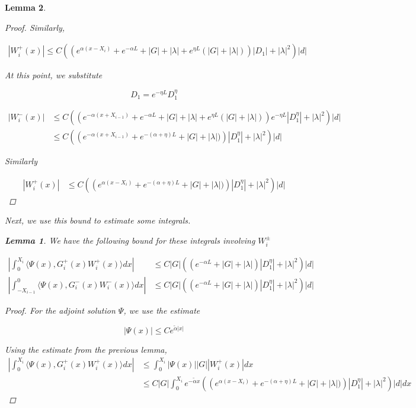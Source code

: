 \documentclass[12pt]{article}
\newtheorem{lemma}{Lemma}
\begin{document}
\begin{lemma}
\begin{proof}
Similarly,

\begin{align*}
| W_i^+(x)| \leq C\left(\left( e^{\alpha(x - X_{i})} + e^{-\alpha L} + |G| + |\lambda| + e^{\eta L}(|G| + |\lambda|) \right)|D_1| + |\lambda|^2 \right) |d|
\end{align*}

At this point, we substitute

\[
D_1 = e^{-\eta L} D_1^{\eta}
\]

\begin{align*}
| W_i^-(x)| &\leq C\left(\left( e^{-\alpha(x + X_{i-1})} + e^{-\alpha L} + |G| + |\lambda| + e^{\eta L}(|G| + |\lambda|) \right)e^{-\eta L} |D_1^{\eta}| + |\lambda|^2 \right) |d| \\
&\leq C\left(\left( e^{-\alpha(x + X_{i-1})} + e^{-(\alpha + \eta) L} + |G| + |\lambda| ) \right) |D_1^{\eta}| + |\lambda|^2 \right) |d|
\end{align*}

Similarly

\begin{align*}
| W_i^+(x)| &\leq C\left(\left( e^{\alpha(x - X_{i})} + e^{-(\alpha + \eta) L} + |G| + |\lambda| ) \right) |D_1^{\eta}| + |\lambda|^2 \right) |d|
\end{align*}

\end{proof}

Next, we use this bound to estimate some integrals.

\begin{lemma}
We have the following bound for these integrals involving $W_i^\pm$

\begin{align*}
\left| \int_0^{X_i} \langle \Psi(x), G_i^+(x) W_i^+(x) \rangle dx \right| &\leq C|G| \left( \left( e^{-\alpha L} + |G| + |\lambda|  \right) |D_1^{\eta}| + |\lambda|^2 \right)|d| \\
\left| \int_{-X_{i-1}}^0 \langle \Psi(x), G_i^-(x) W_i^-(x) \rangle dx \right| &\leq C|G| \left( \left( e^{-\alpha L} + |G| + |\lambda|  \right) |D_1^{\eta}| + |\lambda|^2 \right)|d|
\end{align*}

\begin{proof}

For the adjoint solution $\Psi$, we use the estimate

\[
|\Psi(x)| \leq C e^{\tilde{\alpha}|x|}
\]

Using the estimate from the previous lemma,
\begin{align*}
\left| \int_0^{X_i} \langle \Psi(x), G_i^+(x) W_i^+(x) \rangle dx \right| &\leq \int_0^{X_i} |\Psi(x)||G| |W_i^+(x)| dx \\
&\leq C|G| \int_0^{X_i} e^{-\tilde{\alpha} x} \left(\left( e^{\alpha(x - X_{i})} + e^{-(\alpha + \eta) L} + |G| + |\lambda| ) \right) |D_1^{\eta}| + |\lambda|^2 \right) |d|dx 
\end{align*}


\end{proof}
\end{lemma}
\end{lemma}
\end{document}
